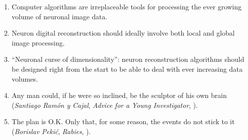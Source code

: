 \documentclass[10pt,a5paper]{report}
\begin{document}
\begin{enumerate}[leftmargin=2.5mm]
\medskip 

\item Computer algorithms are irreplaceable tools for processing the ever growing volume of neuronal image data. 

\medskip
  
\item Neuron digital reconstruction should ideally involve both local and global image processing.

\medskip

\item ``Neuronal curse of dimensionality'': neuron reconstruction algorithms should be designed right from the start to be able to deal with ever increasing data volumes.

\medskip

\item Any man could, if he were so inclined, be the sculptor of his own brain (\emph{Santiago Ram\'{o}n y Cajal}, \emph{Advice for a Young Investigator}, ).

\medskip

\item The plan is O.K. Only that, for some reason, the events do not stick to it (\emph{Borislav Peki\'{c}}, \emph{Rabies}, ).

\end{enumerate}

\end{document}
